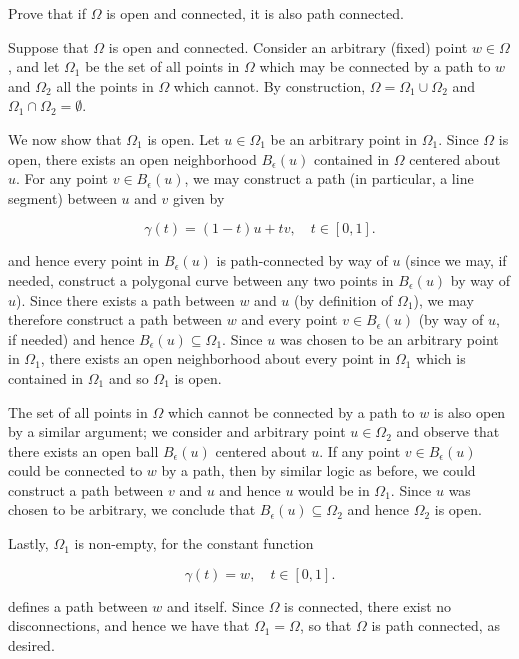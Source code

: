 Prove that if $\Omega$ is open and connected, it is also path connected.

\begin{solution}
    Suppose that $\Omega$ is open and connected. Consider an arbitrary (fixed) point $w \in \Omega$, and let $\Omega_1$
    be the set of all points in $\Omega$ which may be connected by a path to $w$ and $\Omega_2$ all the points in 
    $\Omega$ which cannot. By construction, $\Omega = \Omega_1 \cup \Omega_2$ and $\Omega_1 \cap \Omega_2 = \emptyset$.
    
    We now show that $\Omega_1$ is open. Let $u \in \Omega_1$ be an arbitrary point in 
    $\Omega_1$. Since $\Omega$ is open, there exists an open neighborhood $B_{\epsilon}(u)$ contained in $\Omega$ 
    centered about $u$. For any point $v \in B_{\epsilon}(u)$, we may construct a path (in particular, a line segment) 
    between $u$ and $v$ given by

    $$
        \gamma(t) = (1-t)u + tv, \quad t \in [0,1].
    $$  

    and hence every point in $B_{\epsilon}(u)$ is path-connected by way of $u$ (since we may, if needed, construct a 
    polygonal curve between any two points in $B_{\epsilon}(u)$ by way of $u$). Since there exists a path between $w$ 
    and $u$ (by definition of $\Omega_1$), we may therefore construct a path between $w$ and every point 
    $v \in B_{\epsilon}(u)$ (by way of $u$, if needed) and hence $B_{\epsilon}(u) \subseteq \Omega_1$. Since $u$ was 
    chosen to be an arbitrary point in $\Omega_1$, there exists an open neighborhood about every point in $\Omega_1$
    which is contained in $\Omega_1$ and so $\Omega_1$ is open.

    The set of all points in $\Omega$ which cannot be connected by a path to $w$ is also open by a similar argument; we
    consider and arbitrary point $u \in \Omega_2$ and observe that there exists an open ball $B_{\epsilon}(u)$ centered
    about $u$. If any point $v \in B_{\epsilon}(u)$ could be connected to $w$ by a path, then by similar logic as 
    before, we could construct a path between $v$ and $u$ and hence $u$ would be in $\Omega_1$. Since $u$ was chosen to
    be arbitrary, we conclude that $B_{\epsilon}(u) \subseteq \Omega_2$ and hence $\Omega_2$ is open.

    Lastly, $\Omega_1$ is non-empty, for the constant function
    
    $$
        \gamma(t) = w, \quad t \in [0,1].
    $$

    defines a path between $w$ and itself. Since $\Omega$ is connected, there exist no disconnections, and hence we have
    that $\Omega_1 = \Omega$, so that $\Omega$ is path connected, as desired.
    \ \\
\end{solution}